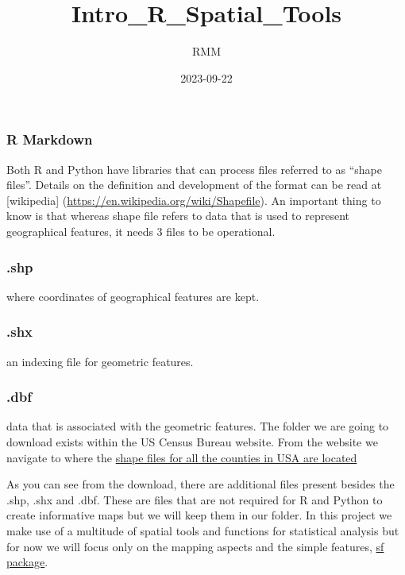 \documentclass[
]{article}
\title{Intro\_R\_Spatial\_Tools}
\author{RMM}
\date{2023-09-22}
\begin{document}
\maketitle

\hypertarget{r-markdown}{%
\subsubsection{R Markdown}\label{r-markdown}}

Both R and Python have libraries that can process files referred to as
``shape files''. Details on the definition and development of the format
can be read at {[}wikipedia{]}
(\url{https://en.wikipedia.org/wiki/Shapefile}). An important thing to
know is that whereas shape file refers to data that is used to represent
geographical features, it needs 3 files to be operational.

\hypertarget{shp}{%
\subsubsection{.shp}\label{shp}}

where coordinates of geographical features are kept.

\hypertarget{shx}{%
\subsubsection{.shx}\label{shx}}

an indexing file for geometric features.

\hypertarget{dbf}{%
\subsubsection{.dbf}\label{dbf}}

data that is associated with the geometric features. The folder we are
going to download exists within the US Census Bureau website. From the
website we navigate to where the
\href{https://www2.census.gov/geo/tiger/TIGER2021/COUNTY/}{shape files
for all the counties in USA are located}

As you can see from the download, there are additional files present
besides the .shp, .shx and .dbf. These are files that are not required
for R and Python to create informative maps but we will keep them in our
folder. In this project we make use of a multitude of spatial tools and
functions for statistical analysis but for now we will focus only on the
mapping aspects and the simple features,
\href{https://r-spatial.github.io/sf/}{sf package}.
\end{document}

